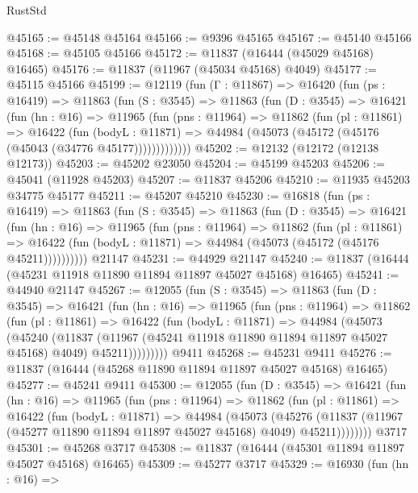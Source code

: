 \begin{lexlean}{RustStd}
\begin{coremodule}
{\begin{coremodule}
{{{{{{{{{{{{{{{{{{{{{{{{{{{{{{{{{{{{{{{{{{{{{{{{{{@45165 := @45148 @45164
@45166 := @9396 @45165
@45167 := @45140 @45166
@45168 := @45105 @45166
@45172 := @11837 (@16444 (@45029 @45168) @16465)
@45176 := @11837 (@11967 (@45034 @45168) @4049)
@45177 := @45115 @45166
@45199 := @12119
    (fun (Γ : @11867) =>
    @16420
      (fun (ps : @16419) =>
      @11863
        (fun (S : @3545) =>
        @11863
          (fun (D : @3545) =>
          @16421
            (fun (hn : @16) =>
            @11965
              (fun (pns : @11964) =>
              @11862
                (fun (pl : @11861) =>
                @16422
                  (fun (bodyL : @11871) =>
                  @44984 (@45073 (@45172 (@45176 (@45043 (@34776 @45177)))))))))))))
@45202 := @12132 (@12172 (@12138 @12173))
@45203 := @45202 @23050
@45204 := @45199 @45203
@45206 := @45041 (@11928 @45203)
@45207 := @11837 @45206
@45210 := @11935 @45203 @34775 @45177
@45211 := @45207 @45210
@45230 := @16818
    (fun (ps : @16419) =>
    @11863
      (fun (S : @3545) =>
      @11863
        (fun (D : @3545) =>
        @16421
          (fun (hn : @16) =>
          @11965
            (fun (pns : @11964) =>
            @11862
              (fun (pl : @11861) =>
              @16422 (fun (bodyL : @11871) => @44984 (@45073 (@45172 (@45176 @45211))))))))))
    @21147
@45231 := @44929 @21147
@45240 := @11837 (@16444 (@45231 @11918 @11890 @11894 @11897 @45027 @45168) @16465)
@45241 := @44940 @21147
@45267 := @12055
    (fun (S : @3545) =>
    @11863
      (fun (D : @3545) =>
      @16421
        (fun (hn : @16) =>
        @11965
          (fun (pns : @11964) =>
          @11862
            (fun (pl : @11861) =>
            @16422
              (fun (bodyL : @11871) =>
              @44984
                (@45073
                  (@45240
                    (@11837
                      (@11967 (@45241 @11918 @11890 @11894 @11897 @45027 @45168) @4049)
                      @45211)))))))))
    @9411
@45268 := @45231 @9411
@45276 := @11837 (@16444 (@45268 @11890 @11894 @11897 @45027 @45168) @16465)
@45277 := @45241 @9411
@45300 := @12055
    (fun (D : @3545) =>
    @16421
      (fun (hn : @16) =>
      @11965
        (fun (pns : @11964) =>
        @11862
          (fun (pl : @11861) =>
          @16422
            (fun (bodyL : @11871) =>
            @44984
              (@45073
                (@45276
                  (@11837 (@11967 (@45277 @11890 @11894 @11897 @45027 @45168) @4049) @45211))))))))
    @3717
@45301 := @45268 @3717
@45308 := @11837 (@16444 (@45301 @11894 @11897 @45027 @45168) @16465)
@45309 := @45277 @3717
@45329 := @16930
    (fun (hn : @16) =>
}}}}}}}}}}}}}}}}}}}}}}}}}}}}}}}}}}}}}}}}}}}}}}}}}}
\end{coremodule}}
\end{coremodule}
\end{lexlean}
